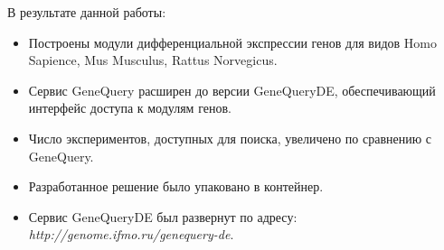 \documentclass[times,specification,annotation]{itmo-student-thesis}
\begin{document}
\startconclusionpage

В результате данной работы:
\begin{itemize}
    \item Построены модули дифференциальной экспрессии генов для видов Homo Sapience, Mus Musculus, Rattus Norvegicus.
    \item Сервис GeneQuery расширен до версии GeneQueryDE, обеспечивающий интерфейс доступа к модулям генов. 
    \item Число экспериментов, доступных для поиска, увеличено по сравнению с GeneQuery. 
    \item Разработанное решение было упаковано в контейнер.
    \item Сервис GeneQueryDE был развернут по адресу: \textit{http://genome.ifmo.ru/genequery-de}.​
\end{itemize}

\printmainbibliography
\end{document}
